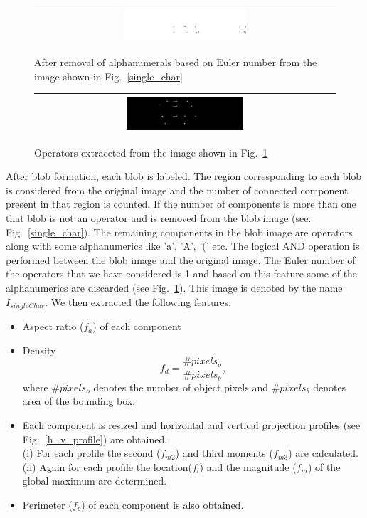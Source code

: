 \documentclass[12pt]{IEEEtran}
\begin{document}
\begin{itemize}
\begin{figure}[h]\center\footnotesize
\begin{tabular}{|c|}\hline
 \includegraphics[width=0.42\textwidth]{singleCharafterEuler.png} \\\hline
 \end{tabular} 
 \caption{After removal of alphanumerals based on Euler number from the image shown
in Fig.~\ref{single_char}}
 \label{after_euler}
\end{figure}

\begin{figure}[h]\center\footnotesize
\begin{tabular}{|c|}\hline
 \includegraphics[width=0.4\textwidth]{operator.png} \\\hline
 \end{tabular} 
 \caption{Operators extraceted from the image shown in Fig.~\ref{after_euler}}
 \label{operator}
\end{figure}

After blob formation, each blob is labeled. The region corresponding to each blob is considered from
the original image and the number of connected component present in that region is counted. If the number of components
is more than one that blob is not an operator and is removed from the blob image (see. Fig.~\ref{single_char}).
The remaining components in the blob image are operators along with some alphanumerics like 'a', 'A', '(' etc.
The logical AND operation is performed between the blob image and the original image. 
The Euler number of the operators
that we have considered is 1 and based on this feature some of the alphanumerics are discarded (see Fig.~\ref{after_euler}).
This image is denoted by the name $I_{singleChar}$.
We then extracted the following features:\\
\begin{itemize}
 \item Aspect ratio ($f_a$) of each component
 \item 
 Density \[f_d   = \frac{\#pixels_o} {\#pixels_b}, \]
 where $\#pixels_o$ denotes the number of object pixels and $\#pixels_b$ denotes area of the bounding box.
 \item Each component is resized and horizontal and vertical projection profiles (see Fig.~\ref{h_v_profile})  are obtained.\\
 (i) For each profile the second ($f_{m2}$) and third moments ($f_{m3}$) are calculated. \\
 (ii) Again for each profile the location($f_l$) and the magnitude ($f_m$) of the global maximum are determined.
 \item Perimeter ($f_p$)  of each component is also obtained.
\end{itemize}


\end{itemize}
\end{document}
